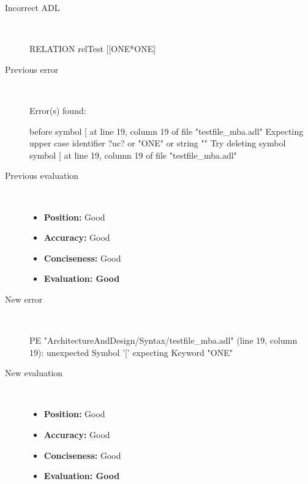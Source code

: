 \hrulefill

\begin{description}
  \item[Incorrect ADL]~\\
\begin{adl}
RELATION relTest [[ONE*ONE]\end{adl}
  \item[Previous error]~\\
\begin{haskell}
Error(s) found:

before symbol [ at line 19, column 19 of file "testfile_mba.adl"
Expecting upper case identifier ?uc? or "ONE" or string ""
Try deleting symbol symbol [ at line 19, column 19 of file "testfile_mba.adl"
\end{haskell}
  \item[Previous evaluation]~\\
    \begin{itemize}
    \item \textbf{Position:} Good
    \item \textbf{Accuracy:} Good
    \item \textbf{Conciseness:} Good
    \item \textbf{Evaluation: Good}
    \end{itemize}
  \item[New error]~\\
\begin{haskell}
PE "ArchitectureAndDesign/Syntax/testfile_mba.adl" (line 19, column 19):
unexpected Symbol '['
expecting Keyword "ONE"\end{haskell}
  \item[New evaluation]~\\
    \begin{itemize}
    \item \textbf{Position:} Good
    \item \textbf{Accuracy:} Good
    \item \textbf{Conciseness:} Good
    \item \textbf{Evaluation: Good}
    \end{itemize}
  \end{description}

\hrulefill


